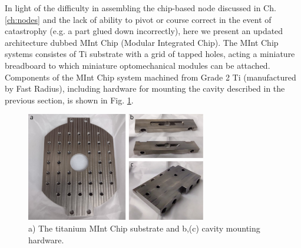 In light of the difficulty in assembling the chip-based node discussed in Ch. \ref{ch:nodes} and the lack of ability to pivot or course correct in the event of catastrophy (e.g. a part glued down incorrectly), here we present an updated architecture dubbed MInt Chip (Modular Integrated Chip). The MInt Chip systems consistes of Ti substrate with a grid of tapped holes, acting a miniature breadboard to which miniature optomechanical modules can be attached. Components of the MInt Chip system machined from Grade 2 Ti (manufactured by Fast Radius), including hardware for mounting the cavity described in the previous section, is shown in Fig. \ref{fig:mintchip}.
\begin{figure}[htb]
    \centering
    \includegraphics[width=0.7\textwidth]{Images/mint_chip.pdf}
    \caption{a) The titanium MInt Chip substrate and b,(c) cavity mounting hardware.}
    \label{fig:mintchip}
\end{figure}

